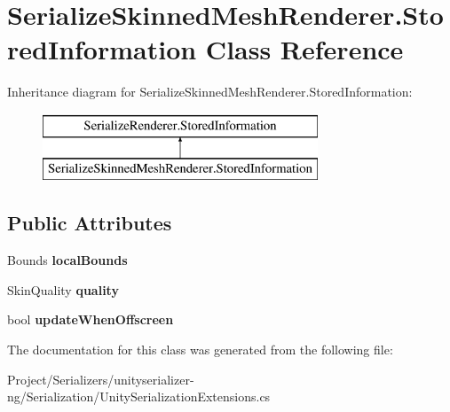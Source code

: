 \hypertarget{class_serialize_skinned_mesh_renderer_1_1_stored_information}{}\section{Serialize\+Skinned\+Mesh\+Renderer.\+Stored\+Information Class Reference}
\label{class_serialize_skinned_mesh_renderer_1_1_stored_information}
Inheritance diagram for Serialize\+Skinned\+Mesh\+Renderer.\+Stored\+Information\+:\begin{figure}[H]
\begin{center}
\leavevmode
\includegraphics[height=2.000000cm]{class_serialize_skinned_mesh_renderer_1_1_stored_information}
\end{center}
\end{figure}
\subsection*{Public Attributes}
\begin{DoxyCompactItemize}
\item 
\mbox{\label{class_serialize_skinned_mesh_renderer_1_1_stored_information_ac121d2d52cdf6eefb978699aef61fcc8}} 
Bounds {\bfseries local\+Bounds}
\item 
\mbox{\label{class_serialize_skinned_mesh_renderer_1_1_stored_information_a57cc5d47dfc78d1cfe959ff8de995edd}} 
Skin\+Quality {\bfseries quality}
\item 
\mbox{\label{class_serialize_skinned_mesh_renderer_1_1_stored_information_a63c3f6ad98a2c3c962265fdee5ce1858}} 
bool {\bfseries update\+When\+Offscreen}
\end{DoxyCompactItemize}


The documentation for this class was generated from the following file\+:\begin{DoxyCompactItemize}
\item 
Project/\+Serializers/unityserializer-\/ng/\+Serialization/Unity\+Serialization\+Extensions.\+cs\end{DoxyCompactItemize}
